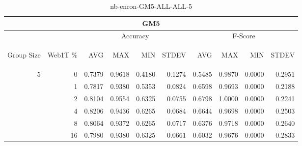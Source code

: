 \begin{center}
\begin{table}[htbp]
\begin{tabular}{ | r | r | r | r | r | r | r | r | r | r |}
\hline
\multicolumn{10}{|c|}{GM5}\\
\hline
 & & \multicolumn{4}{|c|}{Accuracy} & \multicolumn{4}{|c|}{F-Score}\\ \cline{3-10}
\begin{sideways}Group Size\end{sideways} & \begin{sideways}Web1T \%\end{sideways} & \begin{sideways}AVG\end{sideways} & \begin{sideways}MAX\end{sideways} & \begin{sideways}MIN\end{sideways} & \begin{sideways}STDEV\end{sideways} & \begin{sideways}AVG\end{sideways} & \begin{sideways}MAX\end{sideways} & \begin{sideways}MIN\end{sideways} & \begin{sideways}STDEV\end{sideways}\\
\hline
\multirow{5}{*}{5}
 & 0 & 0.7379 & 0.9618 & 0.4180 & 0.1274 & 0.5485 & 0.9870 & 0.0000 & 0.2951\\ \cline{2-10}
 & 1 & 0.7817 & 0.9380 & 0.5353 & 0.0824 & 0.6598 & 0.9693 & 0.0000 & 0.2188\\ \cline{2-10}
 & 2 & 0.8104 & 0.9554 & 0.6325 & 0.0755 & 0.6798 & 1.0000 & 0.0000 & 0.2241\\ \cline{2-10}
 & 4 & 0.8206 & 0.9436 & 0.6265 & 0.0684 & 0.6644 & 0.9698 & 0.0000 & 0.2503\\ \cline{2-10}
 & 8 & 0.8064 & 0.9372 & 0.6265 & 0.0717 & 0.6376 & 0.9718 & 0.0000 & 0.2640\\ \cline{2-10}
 & 16 & 0.7980 & 0.9380 & 0.6325 & 0.0661 & 0.6032 & 0.9676 & 0.0000 & 0.2833\\ \cline{2-10}
\hline
\end{tabular}
\caption{nb-enron-GM5-ALL-ALL-5}
\label{table:nb-enron-GM5-ALL-ALL-5}
\end{table}
\end{center}

